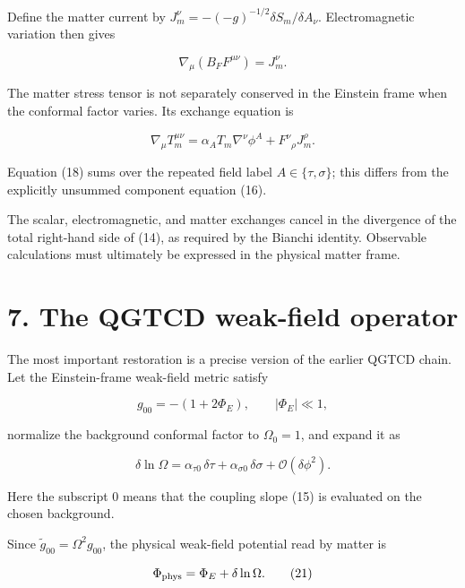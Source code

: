 \documentclass[
  american,
  11pt,
  letterpaper,
]{article}
\begin{document}
Define the matter current by \(J_m^\nu=-(-g)^{-1/2}\delta S_m/\delta A_\nu\). Electromagnetic variation then gives

\begin{equation}
\nabla_\mu\left(B_FF^{\mu\nu}\right)=J_m^\nu .
\tag{17}
\end{equation}

The matter stress tensor is not separately conserved in the Einstein frame when the conformal factor varies. Its exchange equation is

\begin{equation}
\nabla_\mu T_m^{\mu\nu}
=\alpha_A T_m\nabla^\nu\phi^A
+F^\nu{}_\rho J_m^\rho .
\tag{18}
\end{equation}

Equation (18) sums over the repeated field label \(A\in\{\tau,\sigma\}\); this differs from the explicitly unsummed component equation (16).

The scalar, electromagnetic, and matter exchanges cancel in the divergence of the total right-hand side of (14), as required by the Bianchi identity. Observable calculations must ultimately be expressed in the physical matter frame.

\section{7. The QGTCD weak-field operator}\label{the-qgtcd-weak-field-operator}

The most important restoration is a precise version of the earlier QGTCD chain. Let the Einstein-frame weak-field metric satisfy

\begin{equation}
g_{00}=-(1+2\Phi_E),
\qquad |\Phi_E|\ll1,
\tag{19}
\end{equation}

normalize the background conformal factor to \(\Omega_0=1\), and expand it as

\begin{equation}
\delta\ln\Omega
=\alpha_{\tau0}\,\delta\tau
+\alpha_{\sigma0}\,\delta\sigma
+\mathcal{O}(\delta\phi^2).
\tag{20}
\end{equation}

Here the subscript \(0\) means that the coupling slope (15) is evaluated on the chosen background.

Since \(\tilde g_{00}=\Omega^2g_{00}\), the physical weak-field potential read by matter is

\begin{equation}
\Phi_{\rm phys}=\Phi_E+\delta\ln\Omega .
\tag{21}
\end{equation}
\end{document}
